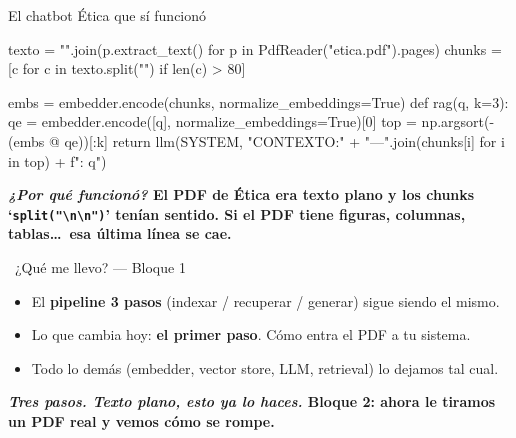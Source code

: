 \documentclass[aspectratio=169, 11pt]{beamer}
\begin{document}
\begin{frame}{El chatbot Ética que sí funcionó}
  \vspace{4pt}
  \begin{pyblock}
texto  = "\n".join(p.extract_text() for p in PdfReader("etica.pdf").pages)
chunks = [c for c in texto.split("\n\n") if len(c) > 80]

embs = embedder.encode(chunks, normalize_embeddings=True)
def rag(q, k=3):
    qe = embedder.encode([q], normalize_embeddings=True)[0]
    top = np.argsort(-(embs @ qe))[:k]
    return llm(SYSTEM, "CONTEXTO:\n" + "\n---\n".join(chunks[i] for i in top) +
                       f"\n\nPREGUNTA: {q}")
  \end{pyblock}
  \vspace{6pt}
  \begin{tcolorbox}[colback=arcaRed!8, colframe=arcaRed, leftrule=3pt,
    boxrule=0pt, sharp corners, left=8pt, right=8pt, top=3pt, bottom=3pt]
    {\footnotesize\color{arcaDark}\bfseries
    \emph{¿Por qué funcionó?} El PDF de Ética era \textbf{texto plano} y los chunks
    `\texttt{split("\textbackslash n\textbackslash n")}' tenían sentido.
    Si el PDF tiene figuras, columnas, tablas\ldots\ esa última línea se cae.}
  \end{tcolorbox}
\end{frame}

\begin{frame}[shrink]{\faIndustry\ ¿Qué me llevo? --- Bloque 1}
  \vspace{8pt}
  \begin{itemize}\setlength{\itemsep}{6pt}
    \footnotesize
    \item El \textbf{pipeline 3 pasos} (indexar / recuperar / generar) sigue siendo el mismo.
    \item Lo que cambia hoy: \textbf{el primer paso}. Cómo entra el PDF a tu sistema.
    \item Todo lo demás (embedder, vector store, LLM, retrieval) lo dejamos tal cual.
  \end{itemize}
  \vspace{12pt}
  \begin{tcolorbox}[colback=arcaRed!8, colframe=arcaRed, leftrule=3pt,
    boxrule=0pt, sharp corners, left=8pt, right=8pt, top=4pt, bottom=4pt]
    {\footnotesize\color{arcaDark}\bfseries
    \emph{Tres pasos. Texto plano, esto ya lo haces.}
    \faArrowRight\;Bloque 2: ahora le tiramos un PDF real y vemos cómo se rompe.}
  \end{tcolorbox}
\end{frame}
\end{document}
